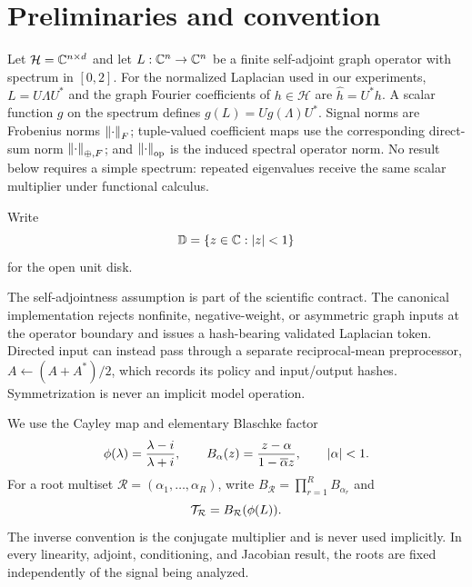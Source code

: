 \section{Preliminaries and convention}
\label{sec:preliminaries}

Let $\mathcal H=\mathbb C^{n\times d}$ and let $L:\mathbb C^n\to\mathbb C^n$ be a finite
self-adjoint graph operator with spectrum in $[0,2]$.  For the normalized
Laplacian used in our experiments, $L=U\Lambda U^*$ and the graph Fourier
coefficients of $h\in\mathcal H$ are $\widehat h=U^*h$.  A scalar function
$g$ on the spectrum defines $g(L)=Ug(\Lambda)U^*$.  Signal norms are
Frobenius norms $\left\lVert \cdot\right\rVert_F$; tuple-valued coefficient maps use the
corresponding direct-sum norm $\left\lVert \cdot\right\rVert_{\oplus,F}$; and
$\left\lVert \cdot\right\rVert_{\mathrm{op}}$ is the induced spectral operator norm.  No result
below requires a simple spectrum: repeated eigenvalues receive the same
scalar multiplier under functional calculus.

Write
\begin{equation}
  \mathbb D=\{z\in\mathbb C:|z|<1\}
  \label{eq:open-unit-disk}
\end{equation}
for the open unit disk.

The self-adjointness assumption is part of the scientific contract.  The
canonical implementation rejects nonfinite, negative-weight, or asymmetric
graph inputs at the operator boundary and issues a hash-bearing validated
Laplacian token.  Directed input can instead pass through a separate
reciprocal-mean preprocessor, $A\leftarrow(A+A^*)/2$, which records its policy
and input/output hashes.  Symmetrization is never an implicit model operation.

We use the Cayley map and elementary Blaschke factor
\begin{equation}
  \phi(\lambda)=\frac{\lambda-i}{\lambda+i},
  \qquad
  B_\alpha(z)=\frac{z-\alpha}{1-\overline\alpha z},
  \qquad |\alpha|<1.
  \label{eq:definitions}
\end{equation}
For a root multiset $\mathcal R=(\alpha_1,\ldots,\alpha_R)$, write
$B_{\mathcal R}=\prod_{r=1}^R B_{\alpha_r}$ and
\begin{equation}
  \mathcal T_{\mathcal R}=B_{\mathcal R}(\phi(L)).
  \label{eq:forward-convention}
\end{equation}
The inverse convention is the conjugate multiplier and is never used
implicitly.  In every linearity, adjoint, conditioning, and Jacobian result,
the roots are fixed independently of the signal being analyzed.

